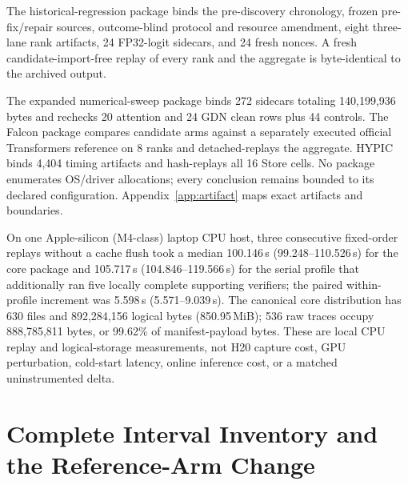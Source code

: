 \documentclass{article}
\begin{document}
The historical-regression package binds the pre-discovery chronology, frozen
pre-fix/repair sources, outcome-blind protocol and resource amendment, eight
three-lane rank artifacts, 24 FP32-logit sidecars, and 24 fresh nonces.  A fresh
candidate-import-free replay of every rank and the aggregate is byte-identical
to the archived output.

The expanded numerical-sweep package binds 272 sidecars totaling 140,199,936
bytes and rechecks 20 attention and 24 GDN clean rows plus 44 controls.  The
Falcon package compares candidate arms against a separately executed official
Transformers reference on 8 ranks and detached-replays the aggregate.  HYPIC
binds 4,404 timing artifacts and hash-replays all 16 Store cells.  No package
enumerates OS/driver allocations; every conclusion remains bounded to its
declared configuration.  Appendix~\ref{app:artifact} maps exact artifacts and
boundaries.

On one Apple-silicon (M4-class) laptop CPU host, three consecutive fixed-order
replays without a
cache flush took a median 100.146\,s (99.248--110.526\,s) for the core package
and 105.717\,s (104.846--119.566\,s) for the serial profile that additionally
ran five locally complete supporting verifiers; the paired within-profile
increment was 5.598\,s (5.571--9.039\,s).  The canonical core distribution has
630 files and 892,284,156 logical bytes (850.95\,MiB); 536 raw traces occupy
888,785,811 bytes, or 99.62\% of manifest-payload bytes.  These are local CPU
replay and logical-storage measurements, not H20 capture cost, GPU perturbation,
cold-start latency, online inference cost, or a matched uninstrumented delta.

\section{Complete Interval Inventory and the Reference-Arm Change}
\label{app:all-intervals}
\end{document}
